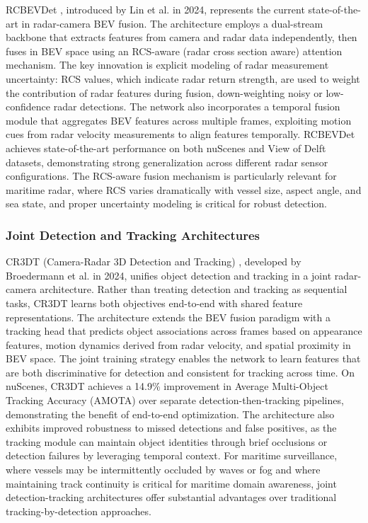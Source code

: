 RCBEVDet \cite{Lin2024RCBEVDet}, introduced by Lin et al. in 2024, represents the current state-of-the-art in radar-camera BEV fusion. The architecture employs a dual-stream backbone that extracts features from camera and radar data independently, then fuses in BEV space using an RCS-aware (radar cross section aware) attention mechanism. The key innovation is explicit modeling of radar measurement uncertainty: RCS values, which indicate radar return strength, are used to weight the contribution of radar features during fusion, down-weighting noisy or low-confidence radar detections. The network also incorporates a temporal fusion module that aggregates BEV features across multiple frames, exploiting motion cues from radar velocity measurements to align features temporally. RCBEVDet achieves state-of-the-art performance on both nuScenes and View of Delft datasets, demonstrating strong generalization across different radar sensor configurations. The RCS-aware fusion mechanism is particularly relevant for maritime radar, where RCS varies dramatically with vessel size, aspect angle, and sea state, and proper uncertainty modeling is critical for robust detection.

\subsubsection{Joint Detection and Tracking Architectures}

CR3DT (Camera-Radar 3D Detection and Tracking) \cite{Broedermann2024CR3DT}, developed by Broedermann et al. in 2024, unifies object detection and tracking in a joint radar-camera architecture. Rather than treating detection and tracking as sequential tasks, CR3DT learns both objectives end-to-end with shared feature representations. The architecture extends the BEV fusion paradigm with a tracking head that predicts object associations across frames based on appearance features, motion dynamics derived from radar velocity, and spatial proximity in BEV space. The joint training strategy enables the network to learn features that are both discriminative for detection and consistent for tracking across time. On nuScenes, CR3DT achieves a 14.9\% improvement in Average Multi-Object Tracking Accuracy (AMOTA) over separate detection-then-tracking pipelines, demonstrating the benefit of end-to-end optimization. The architecture also exhibits improved robustness to missed detections and false positives, as the tracking module can maintain object identities through brief occlusions or detection failures by leveraging temporal context. For maritime surveillance, where vessels may be intermittently occluded by waves or fog and where maintaining track continuity is critical for maritime domain awareness, joint detection-tracking architectures offer substantial advantages over traditional tracking-by-detection approaches.

